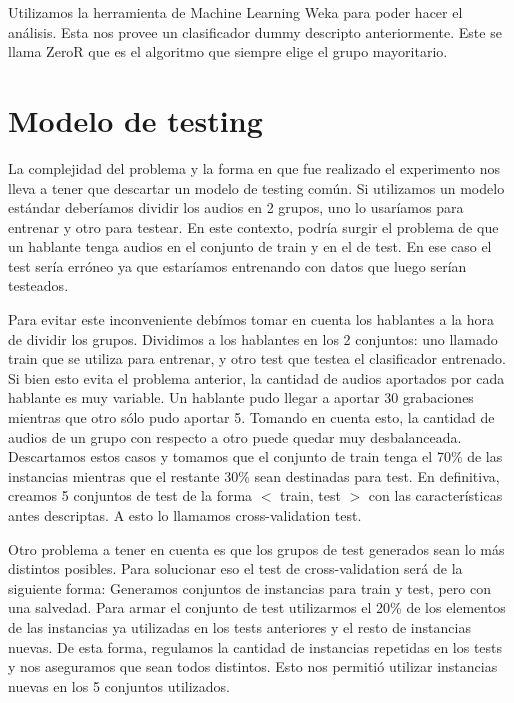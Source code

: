 Utilizamos la herramienta de Machine Learning Weka para poder hacer el análisis. Esta nos provee un clasificador dummy descripto anteriormente. Este se llama ZeroR que es el algoritmo que siempre elige el grupo mayoritario.

\section{Modelo de testing}

La complejidad del problema y la forma en que fue realizado el experimento nos lleva a tener que descartar un modelo de testing común. Si utilizamos un modelo estándar deberíamos dividir los audios en 2 grupos, uno lo usaríamos para entrenar y otro para testear. En este contexto, podría surgir el problema de que un hablante tenga audios en el conjunto de train y en el de test. En ese caso el test sería erróneo ya que estaríamos entrenando con datos que luego serían testeados.

Para evitar este inconveniente debímos tomar en cuenta los hablantes a la hora de dividir los grupos. Dividimos a los hablantes en los 2 conjuntos: uno llamado train que se utiliza para entrenar, y otro test que testea el clasificador entrenado. Si bien esto evita el problema anterior, la cantidad de audios aportados por cada hablante es muy variable. Un hablante pudo llegar a aportar 30 grabaciones mientras que otro sólo pudo aportar 5. Tomando en cuenta esto, la cantidad de audios de un grupo con respecto a otro puede quedar muy desbalanceada. Descartamos estos casos y tomamos que el conjunto de train tenga el 70\% de las instancias mientras que el restante 30\% sean destinadas para test. En definitiva, creamos 5 conjuntos de test de la forma $<$ train, test $>$ con las características antes descriptas. A esto lo llamamos cross-validation test. 

Otro problema a tener en cuenta es que los grupos de test generados sean lo más distintos posibles. Para solucionar eso el test de cross-validation será de la siguiente forma: Generamos conjuntos de instancias para train y test, pero con una salvedad. Para armar el conjunto de test utilizarmos el 20\% de los elementos de las instancias ya utilizadas en los tests anteriores y el resto de instancias nuevas. De esta forma, regulamos la cantidad de instancias repetidas en los tests y nos aseguramos que sean todos distintos. Esto nos permitió  utilizar instancias nuevas en los 5 conjuntos utilizados. 

